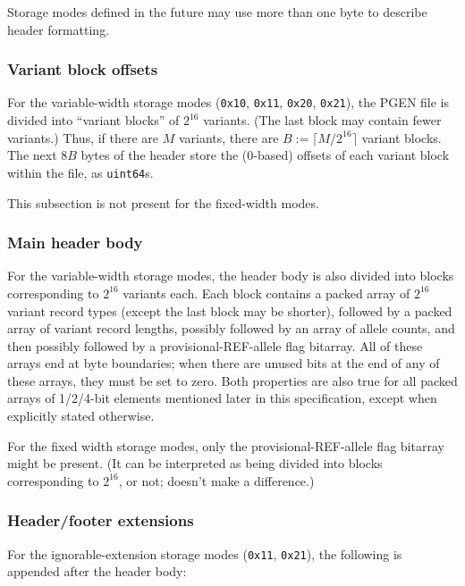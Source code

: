 \documentclass[8pt]{article}
\begin{document}
Storage modes defined in the future may use more than one byte to describe
header formatting.

\subsubsection{Variant block offsets}

For the variable-width storage modes (\texttt{0x10}, \texttt{0x11},
\texttt{0x20}, \texttt{0x21}), the PGEN file is divided into ``variant blocks''
of $2^{16}$ variants.  (The last block may contain fewer variants.) Thus, if
there are $M$ variants, there are $B := \lceil M/2^{16}\rceil$ variant blocks.
The next $8B$ bytes of the header store the (0-based) offsets of each variant
block within the file, as \texttt{uint64}s.

This subsection is not present for the fixed-width modes.

\subsubsection{Main header body}

For the variable-width storage modes, the header body is also divided into
blocks corresponding to $2^{16}$ variants each.  Each block contains a packed
array of $2^{16}$ variant record types (except the last block may be shorter),
followed by a packed array of variant record lengths, possibly followed by an
array of allele counts, and then possibly followed by a provisional-REF-allele
flag bitarray.  All of these arrays end at byte boundaries; when there are
unused bits at the end of any of these arrays, they must be set to zero.  Both
properties are also true for all packed arrays of 1/2/4-bit elements mentioned
later in this specification, except when explicitly stated otherwise.

For the fixed width storage modes, only the provisional-REF-allele flag
bitarray might be present.  (It can be interpreted as being divided into blocks
corresponding to $2^{16}$, or not; doesn't make a difference.)

\subsubsection{Header/footer extensions}

For the ignorable-extension storage modes (\texttt{0x11}, \texttt{0x21}), the
following is appended after the header body:
\end{document}
